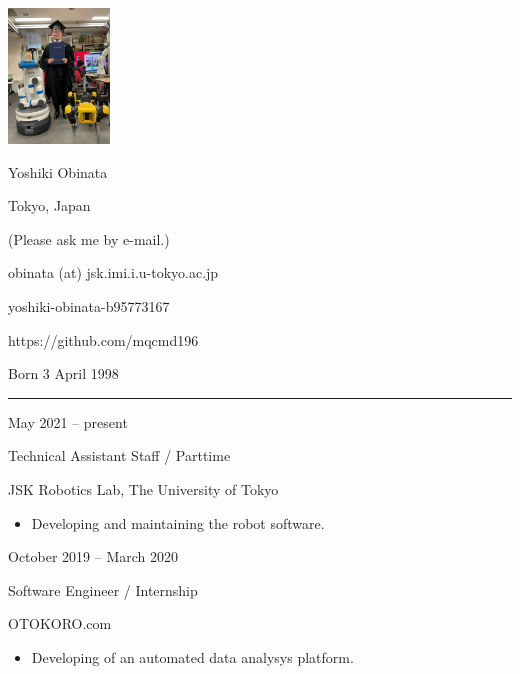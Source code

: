 \documentclass[a4paper,10pt]{article}
\newlength{\cvcolumngapwidth}
\newlength{\cvleftcolumnwidth}
\newlength{\cvrightcolumnwidth}
\newcommand{\cvnamestyle}[1]{{\Large\cvnamefont\textcolor{cvnamecolor}{#1}}}
\newcommand{\cvsectionstyle}[1]{{\normalsize\cvsectionfont\textcolor{cvsectioncolor}{#1}}}
\newcommand{\cvtitlestyle}[1]{{\large\cvtitlefont\textcolor{cvtitlecolor}{#1}}}
\newcommand{\cvdurationstyle}[1]{{\small\cvdurationfont\textcolor{cvdurationcolor}{#1}}}
\newlength{\cvafteritemskipamount}
\newlength{\cvaftersectionskipamount}
\newlength{\cvafternameskipamount}
\newlength{\cvafterpersonalinfolineskipamount}
\newlength{\cvaftertitleskipamount}
\newlength{\cvparskip}
\newcommand{\cvpersonalinfo}[2]{
    \begin{minipage}[t]{\cvleftcolumnwidth}
        \vspace{0mm} %
        \raggedleft #1
    \end{minipage}%
    \hspace{\cvcolumngapwidth}%
    \begin{minipage}[t]{\cvrightcolumnwidth}
        \vspace{0mm} %
        #2
    \end{minipage}

    \vspace{\cvafteritemskipamount}
}
\newcommand{\cvname}[1]{
    \cvnamestyle{#1}

    \vspace{\cvafternameskipamount}
}
\newcommand{\cvpersonalinfolinewithicon}[3]{
    \raisebox{.5\fontcharht\font`E-.5\height}{\texttt{[image: \#2]}}
    #3

    \vspace{\cvafterpersonalinfolineskipamount}
}
\newcommand{\cvsection}[1]{
    \begin{minipage}[t]{\cvleftcolumnwidth}
        \raggedleft\cvsectionstyle{#1}
    \end{minipage}%
    \hspace{\cvcolumngapwidth}%
    \begin{minipage}[t]{\cvrightcolumnwidth}
        \textcolor{cvrulecolor}{\rule{\cvrightcolumnwidth}{0.3mm}}
    \end{minipage}

    \vspace{\cvaftersectionskipamount}
}
\newcommand{\cvitem}[2]{
    \begin{minipage}[t]{\cvleftcolumnwidth}
        \raggedleft #1
    \end{minipage}%
    \hspace{\cvcolumngapwidth}%
    \begin{minipage}[t]{\cvrightcolumnwidth}
        \setlength{\parskip}{\cvparskip} #2
    \end{minipage}

    \vspace{\cvafteritemskipamount}
}
\newcommand{\cvtitle}[1]{
    \cvtitlestyle{#1}

    \vspace{\cvaftertitleskipamount}
    \vspace{-\cvparskip}
}
\begin{document}

\cvpersonalinfo{
    \includegraphics[height=36mm]{resources/photo.jpg}
}{
    \cvname{Yoshiki Obinata}

    \cvpersonalinfolinewithicon{height=4mm}{resources/IcoMoon-Free-PDF/072-location.pdf}{
        Tokyo, Japan
    }

    \cvpersonalinfolinewithicon{height=4mm}{resources/IcoMoon-Free-PDF/067-phone.pdf}{
        (Please ask me by e-mail.)
    }

    \cvpersonalinfolinewithicon{height=4mm}{resources/IcoMoon-Free-PDF/070-envelop.pdf}{
        obinata (at) jsk.imi.i.u-tokyo.ac.jp
    }

    \cvpersonalinfolinewithicon{height=4mm}{resources/IcoMoon-Free-PDF/458-linkedin.pdf}{
        yoshiki-obinata-b95773167
    }

    \cvpersonalinfolinewithicon{height=4mm}{resources/IcoMoon-Free-PDF/433-github.pdf}{
        https://github.com/mqcmd196
    }

    Born 3 April 1998
}



\cvsection{WORK EXPERIENCE}

\cvitem{
    \cvdurationstyle{May 2021 -- present}
}{
    \cvtitle{Technical Assistant Staff / Parttime}

    JSK Robotics Lab, The University of Tokyo

    \begin{itemize}[leftmargin=*]
        \item Developing and maintaining the robot software.
    \end{itemize}
}

\cvitem{
  \cvdurationstyle{October 2019 -- March 2020}
}{
  \cvtitle{Software Engineer / Internship}
  OTOKORO.com
  \begin{itemize}[leftmargin=*]
    \item Developing of an automated data analysys platform.
  \end{itemize}
  
}
\end{document}
